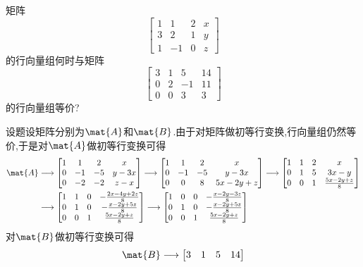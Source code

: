 \documentclass{ctexart}
\begin{document}
\begin{homework}[7]
    矩阵
    \[\begin{bmatrix}
        1&1&2&x\\
        3&2&1&y\\
        1&-1&0&z
    \end{bmatrix}\]
    的行向量组何时与矩阵
    \[\begin{bmatrix}
        3&1&5&14\\
        0&2&-1&11\\
        0&0&3&3
    \end{bmatrix}\]
    的行向量组等价?
\end{homework}
\begin{solution}
    设题设矩阵分别为$\mat{A}$和$\mat{B}$.由于对矩阵做初等行变换,行向量组仍然等价,于是对$\mat{A}$做初等行变换可得
    \[\begin{aligned}
    \mat{A}
    &\longrightarrow\begin{bmatrix}
        1&1&2&x\\
        0&-1&-5&y-3x\\
        0&-2&-2&z-x
    \end{bmatrix}\longrightarrow\begin{bmatrix}
        1&1&2&x\\
        0&-1&-5&y-3x\\
        0&0&8&5x-2y+z
    \end{bmatrix}\longrightarrow\begin{bmatrix}
        1&1&2&x\\
        0&1&5&3x-y\\
        0&0&1&\frac{5x-2y+z}{8}
    \end{bmatrix}\\
    &\longrightarrow\begin{bmatrix}
        1&1&0&-\frac{2x-4y+2z}{8}\\
        0&1&0&-\frac{x-2y+5z}{8}\\
        0&0&1&\frac{5x-2y+z}{8}
    \end{bmatrix}\longrightarrow\begin{bmatrix}
        1&0&0&-\frac{x-2y-3z}{8}\\
        0&1&0&-\frac{x-2y+5z}{8}\\
        0&0&1&\frac{5x-2y+z}{8}
    \end{bmatrix}
    \end{aligned}\]
    对$\mat{B}$做初等行变换可得
    \[\mat{B}\longrightarrow\begin{bmatrix}
        3&1&5&14\\

\end{bmatrix}\]
\end{solution}
\end{document}
